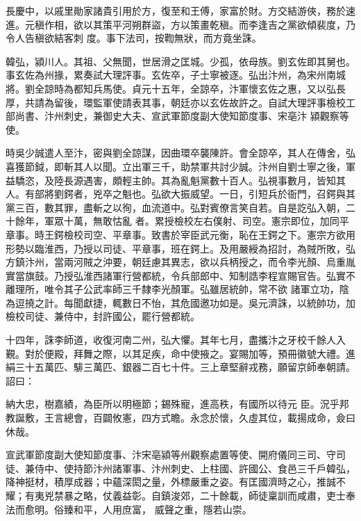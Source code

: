 \begin{pinyinscope}
 長慶中，以戚里勛家諸貴引用於方，復至和王傅，家富於財。方交結游俠，務於速進。元稹作相，欲以其策平河朔群盜，方以策畫乾稹。而李逢吉之黨欲傾裴度，乃令人告稹欲結客刺
 度。事下法司，按鞫無狀，而方竟坐誅。



 韓弘，潁川人。其祖、父無聞，世居滑之匡城。少孤，依母族。劉玄佐即其舅也。事玄佐為州掾，累奏試大理評事。玄佐卒，子士寧被逐。弘出汴州，為宋州南城將。劉全諒時為都知兵馬使。貞元十五年，全諒卒，汴軍懷玄佐之惠，又以弘長厚，共請為留後，環監軍使請表其事，朝廷亦以玄佐故許之。自試大理評事檢校工部尚書、汴州刺史，兼御史大夫、宣武軍節度副大使知節度事、宋亳汴
 潁觀察等使。



 時吳少誠遣人至汴，密與劉全諒謀，因曲環卒襲陳許。會全諒卒，其人在傳舍，弘喜獲節鉞，即斬其人以聞。立出軍三千，助禁軍共討少誠。汴州自劉士寧之後，軍益驕恣，及陸長源遇害，頗輕主帥。其為亂魁黨數十百人。弘視事數月，皆知其人。有部將劉鍔者，兇卒之魁也。弘欲大振威望。一日，引短兵於衙門，召鍔與其黨三百，數其罪，盡斬之以徇，血流道中。弘對賓僚言笑自若。自是訖弘入朝，二十餘年，軍眾十萬，無敢怙亂
 者。累授檢校左右僕射、司空。憲宗即位，加同平章事。時王鍔檢校司空、平章事。致書於宰臣武元衡，恥在王鍔之下。憲宗方欲用形勢以臨淮西，乃授以司徒、平章事，班在鍔上。及用嚴綬為招討，為賊所敗，弘方鎮汴州，當兩河賊之沖要，朝廷慮其異志，欲以兵柄授之，而令李光顏、烏重胤實當旗鼓。乃授弘淮西諸軍行營都統，令兵部郎中、知制誥李程宣賜官告。弘實不離理所，唯令其子公武率師三千隸李光顏軍。弘雖居統帥，常不欲
 諸軍立功，陰為逗撓之計。每聞獻捷，輒數日不怡，其危國邀功如是。吳元濟誅，以統帥功，加檢校司徒、兼侍中，封許國公，罷行營都統。



 十四年，誅李師道，收復河南二州，弘大懼。其年七月，盡攜汴之牙校千餘人入覲。對於便殿，拜舞之際，以其足疾，命中使掖之。宴賜加等，預冊徽號大禮。進絹三十五萬匹、騑三萬匹、銀器二百七十件。三上章堅辭戎務，願留京師奉朝請。詔曰：



 納大忠，樹嘉績，為臣所以明極節；錫殊寵，進高秩，有國所以待元
 臣。況乎邦教誕敷，王言總會，百闢攸憲，四方式瞻。永念於懷，久虛其位，載揚成命，僉曰休哉。



 宣武軍節度副大使知節度事、汴宋亳潁等州觀察處置等使、開府儀同三司、守司徒、兼侍中、使持節汴州諸軍事、汴州刺史、上柱國、許國公、食邑三千戶韓弘，降神挺材，積厚成器；中蘊深閎之量，外標嚴重之姿。有匡國濟時之心，推誠不耀；有夷兇禁暴之略，仗義益彰。自鎮浚郊，二十餘載，師徒稟訓而咸肅，吏士奉法而愈明。俗臻和平，人用庶富，
 威聲之重，隱若山崇。




\end{pinyinscope}
